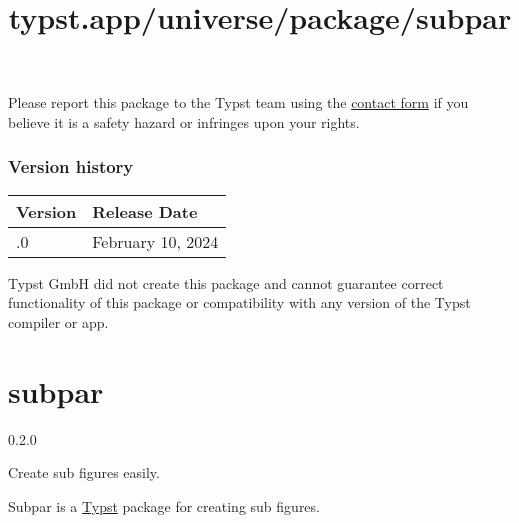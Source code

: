 Please report this package to the Typst team using the
\href{https://typst.app/contact}{contact form} if you believe it is a
safety hazard or infringes upon your rights.

\label{versions}
\subsubsection{Version history}\label{version-history}

\begin{longtable}[]{@{}ll@{}}
\toprule\noalign{}
Version & Release Date \\
\midrule\noalign{}
\endhead
\bottomrule\noalign{}
\endlastfoot
0.1.0 & February 10, 2024 \\
\end{longtable}

Typst GmbH did not create this package and cannot guarantee correct
functionality of this package or compatibility with any version of the
Typst compiler or app.


\title{typst.app/universe/package/subpar}

\label{banner}
\section{subpar}\label{subpar}

{ 0.2.0 }

Create sub figures easily.

\label{readme}
Subpar is a \href{https://typst.app/}{Typst} package for creating sub
figures.

\begin{Shaded}
\begin{Highlighting}[]


\NormalTok{  figure(image("/assets/andromeda.jpg"), caption: [}
\NormalTok{  ]), \textless{}a\textgreater{},}
\NormalTok{  figure(image("/assets/mountains.jpg"), caption: [}
\NormalTok{  ]), \textless{}b\textgreater{},}
\NormalTok{)}

\end{Highlighting}
\end{Shaded}

